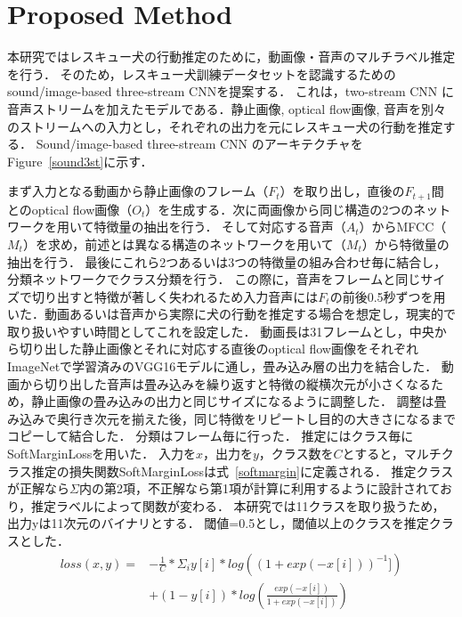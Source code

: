 \documentclass[MIRU,submit,english]{miru2019e}
\begin{document}
\section{Proposed Method}
本研究ではレスキュー犬の行動推定のために，動画像・音声のマルチラベル推定を行う．
そのため，レスキュー犬訓練データセットを認識するためのsound/image-based three-stream CNNを提案する．
これは，two-stream CNN に音声ストリームを加えたモデルである．静止画像, optical flow画像, 音声を別々のストリームへの入力とし，それぞれの出力を元にレスキュー犬の行動を推定する．
Sound/image-based three-stream CNN のアーキテクチャをFigure~\ref{sound3st}に示す．

まず入力となる動画から静止画像のフレーム（$F_t$）を取り出し，直後の$F_{t+1}$間とのoptical flow画像（$O_t$）を生成する．次に両画像から同じ構造の2つのネットワークを用いて特徴量の抽出を行う．
そして対応する音声（$A_t$）からMFCC（$M_t$）を求め，前述とは異なる構造のネットワークを用いて（$M_t$）から特徴量の抽出を行う．
最後にこれら2つあるいは3つの特徴量の組み合わせ毎に結合し，分類ネットワークでクラス分類を行う．
この際に，音声をフレームと同じサイズで切り出すと特徴が著しく失われるため入力音声には$F_t$の前後0.5秒ずつを用いた．動画あるいは音声から実際に犬の行動を推定する場合を想定し，現実的で取り扱いやすい時間としてこれを設定した．
動画長は31フレームとし，中央から切り出した静止画像とそれに対応する直後のoptical flow画像をそれぞれImageNetで学習済みのVGG16モデルに通し，畳み込み層の出力を結合した．
動画から切り出した音声は畳み込みを繰り返すと特徴の縦横次元が小さくなるため，静止画像の畳み込みの出力と同じサイズになるように調整した．
調整は畳み込みで奥行き次元を揃えた後，同じ特徴をリピートし目的の大きさになるまでコピーして結合した．
分類はフレーム毎に行った．
推定にはクラス毎にSoftMarginLossを用いた．
入力を$x$，出力を$y$，クラス数を$C$とすると，マルチクラス推定の損失関数SoftMarginLossは式~\ref{softmargin}に定義される．
推定クラスが正解なら$\Sigma$内の第2項，不正解なら第1項が計算に利用するように設計されており，推定ラベルによって関数が変わる．
本研究では11クラスを取り扱うため，出力yは11次元のバイナリとする．
閾値=0.5とし，閾値以上のクラスを推定クラスとした．
\begin{equation}
    \label{softmargin}
    \begin{split}
    loss(x, y) = &-\frac{1}{C} * \Sigma_{i} y[i] * log((1+exp(-x[i]))^{-1}])\\
    &+ (1 - y[i]) * log(\frac{exp(-x[i])}{1+exp(-x[i])})
    \end{split}
\end{equation}
\end{document}
